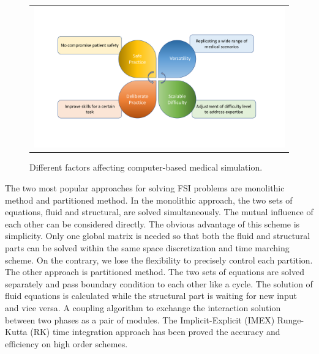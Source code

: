 \begin{figure}[H]
	\centering
	\begin{tabular}{c}
		\includegraphics[width=1.0\textwidth]{./pics/computer_simulation}
	\end{tabular}
	\caption{\footnotesize Different factors affecting computer-based medical simulation.} \label{fig: ch1f1}
\end{figure}

The two most popular approaches for solving FSI problems are monolithic method and partitioned method. In the monolithic approach, the two sets of equations, fluid and structural, are solved simultaneously. The mutual influence of each other can be considered directly. The obvious advantage of this scheme is simplicity. Only one global matrix is needed so that both the fluid and structural parts can be solved within the same space discretization and time marching scheme. On the contrary, we lose the flexibility to precisely control each partition. The other approach is partitioned method. The two sets of equations are solved separately and pass boundary condition to each other like a cycle. The solution of fluid equations is calculated while the structural part is waiting for new input and vice versa. A coupling algorithm to exchange the interaction solution between two phases as a pair of modules. The Implicit-Explicit (IMEX) Runge-Kutta (RK) time integration approach has been proved the accuracy and efficiency on high order schemes\cite{zhang2016high}.

